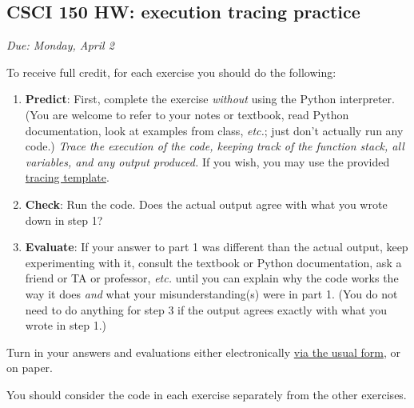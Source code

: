 \documentclass[]{article}
\date{}
\begin{document}
\subsection{CSCI 150 HW: execution tracing
practice}\label{csci-150-hw-execution-tracing-practice}

\emph{Due: Monday, April 2}

To receive full credit, for each exercise you should do the following:

\begin{enumerate}
\def\labelenumi{\arabic{enumi}.}
\item
  \textbf{Predict}: First, complete the exercise \emph{without} using
  the Python interpreter. (You are welcome to refer to your notes or
  textbook, read Python documentation, look at examples from class,
  \emph{etc.}; just don't actually run any code.) \emph{Trace the
  execution of the code, keeping track of the function stack, all
  variables, and any output produced.} If you wish, you may use the
  provided \href{static/tracing-template.pdf}{tracing template}.
\item
  \textbf{Check}: Run the code. Does the actual output agree with what
  you wrote down in step 1?
\item
  \textbf{Evaluate}: If your answer to part 1 was different than the
  actual output, keep experimenting with it, consult the textbook or
  Python documentation, ask a friend or TA or professor, \emph{etc.}
  until you can explain why the code works the way it does \emph{and}
  what your misunderstanding(s) were in part 1. (You do not need to do
  anything for step 3 if the output agrees exactly with what you wrote
  in step 1.)
\end{enumerate}

Turn in your answers and evaluations either electronically
\href{https://goo.gl/forms/XsJVafSZLdedQY1M2}{via the usual form}, or on
paper.

You should consider the code in each exercise separately from the other
exercises.
\end{document}
